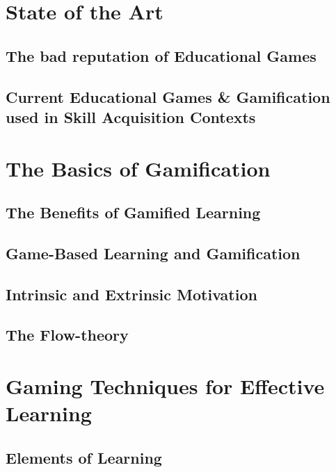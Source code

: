 \documentclass[12pt,a4paper]{report}
\begin{document}
\chapter{State of the Art}


\section{The bad reputation of Educational Games}


\section{Current Educational Games \& Gamification used in Skill Acquisition Contexts}



\chapter{The Basics of Gamification}

\section{The Benefits of Gamified Learning}

\newpage
\section{Game-Based Learning and Gamification}

\newpage
\section{Intrinsic and Extrinsic Motivation}


\section{The Flow-theory}



\chapter{Gaming Techniques for Effective Learning}

\section{Elements of Learning}

\end{document}
